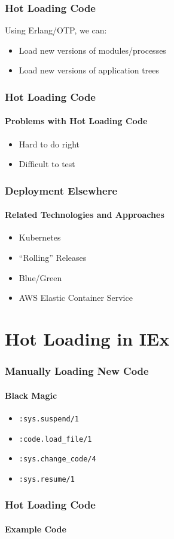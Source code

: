 \documentclass{beamer}
\begin{document}
\begin{frame}
\frametitle{Hot Loading Code}
Using Erlang/OTP, we can:
\begin{itemize}
\item{Load new versions of modules/processes}
\item{Load new versions of application trees}
\end{itemize}
\end{frame}

\begin{frame}
\frametitle{Hot Loading Code}
\framesubtitle{Problems with Hot Loading Code}
\begin{itemize}
\item{Hard to do right}
\item{Difficult to test}
\end{itemize}
\end{frame}

\begin{frame}
\frametitle{Deployment Elsewhere}
\framesubtitle{Related Technologies and Approaches}
\begin{itemize}
\item{Kubernetes\cite{website:kubernetes}}
\item{``Rolling'' Releases}
\item{Blue/Green\cite{website:bluegreendeployment_fowler}}
\item{AWS Elastic Container Service\cite{website:ecs}}
\end{itemize}
\end{frame}

\section{Hot Loading in IEx}

\begin{frame}
\frametitle{Manually Loading New Code}
\framesubtitle{Black Magic}
\begin{itemize}
\item{\texttt{:sys.suspend/1}}
\item{\texttt{:code.load\_file/1}}
\item{\texttt{:sys.change\_code/4}}
\item{\texttt{:sys.resume/1}}
\end{itemize}
\end{frame}

\begin{frame}
\frametitle{Hot Loading Code}
\framesubtitle{Example Code}

\end{frame}
\end{document}
